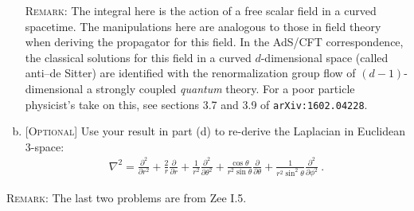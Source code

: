 \documentclass[12pt]{article}
\numberwithin{equation}{section}    %
\begin{document}
\begin{enumerate}[(a)]
	\textsc{Remark}: The integral here is the action of a free scalar field in a curved spacetime. The manipulations here are analogous to those in field theory when deriving the propagator for this field. In the AdS/CFT correspondence, the classical solutions for this field in a curved $d$-dimensional space (called anti--de Sitter) are identified with the renormalization group flow of $(d-1)$-dimensional a strongly coupled \emph{quantum} theory. For a poor particle physicist's take on this, see sections 3.7 and 3.9 of \texttt{arXiv:1602.04228}.
	
\item \textsc{[Optional]} Use your result in part (d) to re-derive the Laplacian in Euclidean 3-space:
\begin{align}
	\nabla^2 = 
	\frac{\partial^2}{\partial r^2}
	+ \frac 2r \frac{\partial}{\partial r}
	+ \frac{1}{r^2} \frac{\partial^2}{\partial \theta^2}
	+ \frac{\cos\theta}{r^2\sin\theta} \frac{\partial}{\partial \theta}
	+ \frac{1}{r^2 \sin^2\theta} \frac{\partial^2}{\partial \phi^2} \ .
\end{align}
\end{enumerate}

\textsc{Remark}: The last two problems are from Zee I.5.

%
%
%
%
\end{document}
